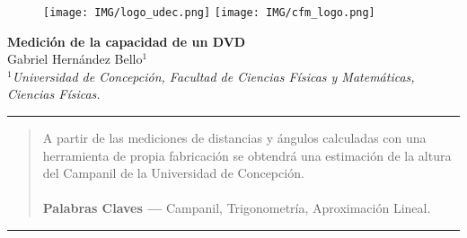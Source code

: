 \documentclass[10pt,a4paper]{article}
\author{Gabriel Hernandez Bello}
\begin{document}
	
	\begin{figure}[H]
		\raggedright
		\texttt{[image: IMG/logo\_udec.png]} \hfill \texttt{[image: IMG/cfm\_logo.png]}
	\end{figure}

	\vspace{6mm}
	\begin{center}
		{\Large \textbf{Medición de la capacidad de un DVD}}\\
		\vspace{2mm}
		{\large Gabriel Hernández Bello$^{1}$}\\
		\vspace{6.5mm}
		$^1$\textit{Universidad de Concepción, Facultad de Ciencias Físicas y Matemáticas, Ciencias Físicas. }\\
	\end{center}

	\begin{center}
		\textcolor{pinegreen}{\rule{150mm}{0.8mm}}
	\end{center}

	\begin{abstract}
	A partir de las mediciones de distancias y ángulos calculadas con una herramienta de propia fabricación se obtendrá una estimación de la altura del Campanil de la Universidad de Concepción.\\
	\\
		\textbf{Palabras Claves ---}  Campanil, Trigonometría, Aproximación Lineal.
	\end{abstract}
	
	\begin{center}
		\textcolor{pinegreen}{\rule{150mm}{0.8mm}}
	\end{center}
	
\end{document}
